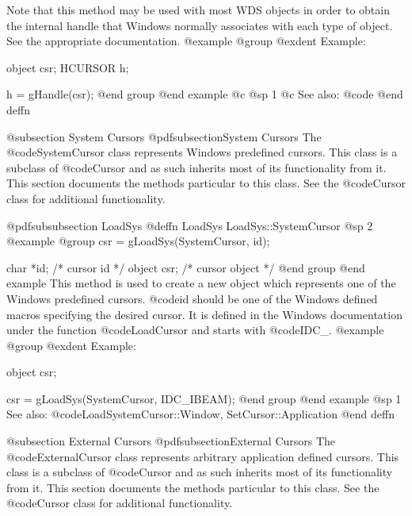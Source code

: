 Note that this method may be used with most WDS objects in order to obtain
the internal handle that Windows normally associates with each type of object.
See the appropriate documentation.
@example
@group
@exdent Example:

object  csr;
HCURSOR h;

h = gHandle(csr);
@end group
@end example
@c @sp 1
@c See also:  @code{}
@end deffn









@subsection System Cursors
@pdfsubsection{System Cursors}
The @code{SystemCursor} class represents Windows predefined cursors.
This class is a subclass of @code{Cursor} and as such inherits most
of its functionality from it.  This section documents the methods
particular to this class.  See the @code{Cursor} class for additional
functionality.











@pdfsubsubsection {LoadSys}
@deffn {LoadSys} LoadSys::SystemCursor
@sp 2
@example
@group
csr = gLoadSys(SystemCursor, id);

char    *id;    /*  cursor id      */
object  csr;    /*  cursor object  */
@end group
@end example
This method is used to create a new object which represents one of the
Windows predefined cursors.  @code{id} should be one of the Windows
defined macros specifying the desired cursor.  It is defined in the
Windows documentation under the function @code{LoadCursor} and
starts with @code{IDC_}.
@example
@group
@exdent Example:

object  csr;

csr = gLoadSys(SystemCursor, IDC_IBEAM);
@end group
@end example
@sp 1
See also:  @code{LoadSystemCursor::Window, SetCursor::Application}
@end deffn





@subsection External Cursors
@pdfsubsection{External Cursors}
The @code{ExternalCursor} class represents arbitrary application defined
cursors.  This class is a subclass of @code{Cursor} and as such inherits
most of its functionality from it.  This section documents the methods
particular to this class.  See the @code{Cursor} class for additional
functionality.






